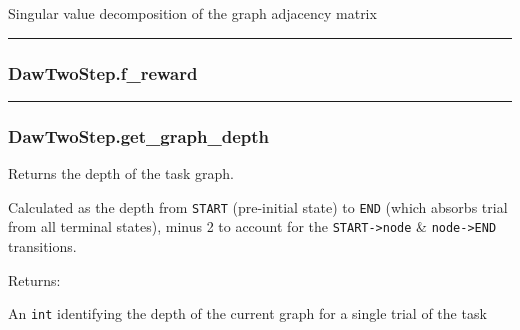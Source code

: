 \begin{Shaded}
\begin{Highlighting}[]
\NormalTok{)}
\end{Highlighting}
\end{Shaded}

Singular value decomposition of the graph adjacency matrix

\begin{center}\rule{0.5\linewidth}{\linethickness}\end{center}

\subsubsection{DawTwoStep.f\_reward}\label{dawtwostep.f_reward}

\begin{Shaded}
\begin{Highlighting}[]
\end{Highlighting}
\end{Shaded}

\begin{center}\rule{0.5\linewidth}{\linethickness}\end{center}

\subsubsection{DawTwoStep.get\_graph\_depth}\label{dawtwostep.get_graph_depth}

\begin{Shaded}
\begin{Highlighting}[]
\NormalTok{)}
\end{Highlighting}
\end{Shaded}

Returns the depth of the task graph.

Calculated as the depth from \texttt{START} (pre-initial state) to
\texttt{END} (which absorbs trial from all terminal states), minus 2 to
account for the \texttt{START-\textgreater{}node} \&
\texttt{node-\textgreater{}END} transitions.

Returns:

An \texttt{int} identifying the depth of the current graph for a single
trial of the task

